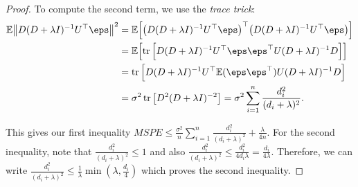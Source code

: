 \begin{proof}
To compute the second term, we use the \emph{trace trick}:
\begin{align*}
	\EE \norm{D(D + \lambda I)^{-1} U\T \eps}^2 &= \EE\qty[ \qty(D(D + \lambda I)^{-1} U\T \eps)\T \qty(D(D + \lambda I)^{-1} U\T \eps)] \\
	&= \EE \qty[\tr\qty[D(D + \lambda I)^{-1} U\T \eps \eps\T U (D + \lambda I)^{-1} D]] \\
	&= \tr\qty[ D(D + \lambda I)^{-1} U\T \EE(\eps\eps\T) U (D + \lambda I)^{-1} D] \\
	&= \sigma^2 \tr \qty[ D^2 (D + \lambda I)^{-2}] = \sigma^2 \sum_{i=1}^n \frac{d_i^2}{(d_i + \lambda)^2}.
\end{align*}

This gives our first inequality $MSPE \leq \frac{\sigma^2}{n} \sum_{i=1}^n \frac{d_i^2}{(d_i + \lambda)^2} + \frac\lambda{4n}$. For the second inequality, note that $\frac{d_i^2}{(d_i + \lambda)^2} \leq 1$ and also $\frac{d_i^2}{(d_i + \lambda)^2} \leq \frac{d_i^2}{4 d_i\lambda} = \frac{d_i}{4\lambda}$. Therefore, we can write $\frac{d_i^2}{(d_i + \lambda)^2} \leq \frac1\lambda \min(\lambda, \frac{d_i}{4})$ which proves the second inequality. 
\end{proof}